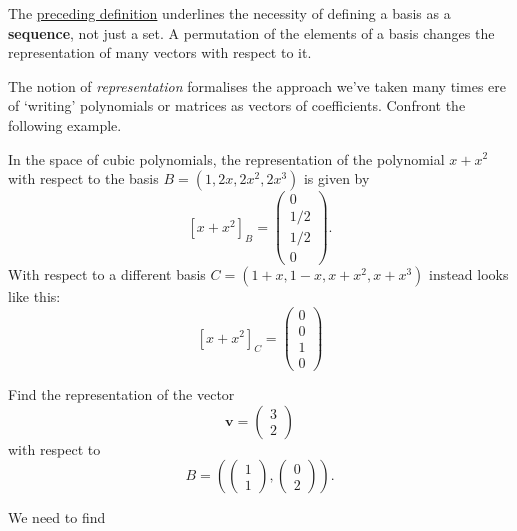 \begin{remark}{}{}
 The \hyperref[def:representation-of-a-vector]{preceding definition} underlines
 the necessity of defining a basis as a \textbf{sequence}, not just a set. A
 permutation of the elements of a basis changes the representation of many
 vectors with respect to it.
\end{remark}

The notion of \emph{representation} formalises the approach we've taken many
times ere of `writing' polynomials or matrices as vectors of coefficients.
Confront the following example. 

\begin{example}{}{}
 In the space of cubic polynomials, the representation of the polynomial $x +
 x^2$ with respect to the basis $B = (1, 2x, 2x^2, 2x^3)$ is given by
 \[
  [x + x^2]_B = 
  \begin{pmatrix}
   0\\
   1 / 2\\
   1 / 2\\
   0  
  \end{pmatrix}.
 \]
 With respect to a different basis $C = (1 + x, 1 - x, x + x^2, x + x^3)$
 instead looks like this:
 \[
  [x + x^2]_C = 
  \begin{pmatrix}
   0\\
   0\\
   1\\
   0
  \end{pmatrix}
 \]
\end{example}

\begin{problem}{}{}
 Find the representation of the vector
 \[
  \mathbf{v} = 
  \begin{pmatrix}
   3\\
   2
  \end{pmatrix}
 \]
 with respect to
 \[
  B = \left( 
   \begin{pmatrix}
    1\\
    1
   \end{pmatrix},
   \begin{pmatrix}
    0\\
    2
   \end{pmatrix}
  \right).
 \]
\end{problem}
\begin{probsol}
 We need to find 
\end{probsol}
